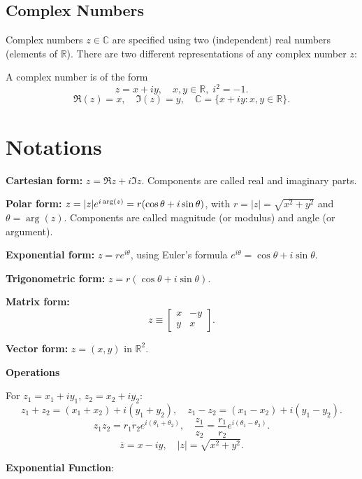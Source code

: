 \begin{highlight}
\subsection{Complex Numbers}
\textcolor{green!70}{Complex numbers} \(z \in \mathbb{C}\) are specified using two (independent) real numbers (elements of \(\mathbb{R}\)).
There are two different representations of any complex number \(z\):

A complex number is of the form
\[
z = x + iy, \quad x,y \in \mathbb{R}, \; i^2=-1.
\]
\[
\Re(z)=x, \quad \Im(z)=y, \quad \mathbb{C} = \{x+iy: x,y\in \mathbb{R}\}.
\]

\section{Notations}
\begin{description}
    \item \textbf{Cartesian form:} $z = \Re z + i \Im z$. Components are called real and imaginary parts. 
    \item \textbf{Polar form:} $z = \lvert z\rvert e^{i \arg(z)} = r(\cos\theta + i\sin\theta)$, with $r=|z|=\sqrt{x^2+y^2}$ and $\theta = \arg(z)$.
          Components are called magnitude (or modulus) and angle (or argument). 
    \item \textbf{Exponential form:} $z = re^{i\theta}$, using Euler’s formula $e^{i\theta}=\cos\theta+i\sin\theta$.
    \item \textbf{Trigonometric form:} $z = r(\cos\theta+i\sin\theta)$.
    \item \textbf{Matrix form:}
    \[
    z \equiv \begin{bmatrix} x & -y \\ y & x \end{bmatrix}.
    \]
    \item \textbf{Vector form:} $z = (x,y)$ in $\mathbb{R}^2$.
\end{description}

\textbf{Operations}

For $z_1=x_1+iy_1$, $z_2=x_2+iy_2$:
\[
z_1+z_2=(x_1+x_2)+i(y_1+y_2), \quad
z_1-z_2=(x_1-x_2)+i(y_1-y_2).
\]
\[
z_1z_2=r_1r_2e^{i(\theta_1+\theta_2)}, \quad
\frac{z_1}{z_2}=\frac{r_1}{r_2}e^{i(\theta_1-\theta_2)}.
\]
\[
\overline{z}=x-iy, \quad |z|=\sqrt{x^2+y^2}.
\]

\textbf{Exponential Function}:


\end{highlight}
